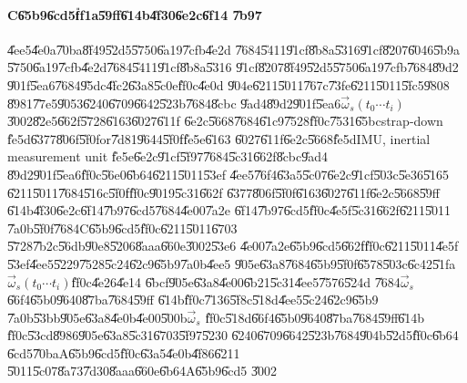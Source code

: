 \documentclass[12pt,a4paper]{article}
\begin{document}
\bigskip

\paragraph{C\U{65b9}\U{6cd5}\U{ff1a}\U{59ff}\U{614b}\U{4f30}\U{6e2c}\U{6f14}%
\U{7b97}}

\U{4ee5}\U{4e0a}\U{70ba}\U{8f49}\U{52d5}\U{5750}\U{6a19}\U{7cfb}\U{4e2d}%
\U{7684}\U{5411}\U{91cf}\U{8b8a}\U{5316}\U{91cf}\U{8207}\U{6046}\U{5b9a}%
\U{5750}\U{6a19}\U{7cfb}\U{4e2d}\U{7684}\U{5411}\U{91cf}\U{8b8a}\U{5316}%
\U{91cf}\U{8207}\U{8f49}\U{52d5}\U{5750}\U{6a19}\U{7cfb}\U{7684}\U{89d2}%
\U{901f}\U{5ea6}\U{7684}\U{95dc}\U{4fc2}\U{63a8}\U{5c0e}\U{ff0c}\U{4e0d}%
\U{904e}\U{6211}\U{5011}\U{767c}\U{73fe}\U{6211}\U{5011}\U{5fc5}\U{9808}%
\U{8981}\U{77e5}\U{9053}\U{6240}\U{6709}\U{6642}\U{523b}\U{7684}\U{8cbc}%
\U{9ad4}\U{89d2}\U{901f}\U{5ea6}$\vec{\omega}_{s}\left( t_{0}\cdots
t_{i}\right) $\U{3002}\U{82e5}\U{662f}\U{5728}\U{6163}\U{6027}\U{611f}%
\U{6e2c}\U{5668}\U{7684}\U{61c9}\U{7528}\U{ff0c}\U{7531}\U{65bc}strap-down%
\U{fe5d}\U{6377}\U{806f}\U{5f0f}or\U{7d81}\U{9644}\U{5f0f}\U{fe5e}\U{6163}%
\U{6027}\U{611f}\U{6e2c}\U{5668}\U{fe5d}IMU, inertial measurement unit%
\U{fe5e}\U{6e2c}\U{91cf}\U{5f97}\U{7684}\U{5c31}\U{662f}\U{8cbc}\U{9ad4}%
\U{89d2}\U{901f}\U{5ea6}\U{ff0c}\U{56e0}\U{6b64}\U{6211}\U{5011}\U{53ef}%
\U{4ee5}\U{76f4}\U{63a5}\U{5c07}\U{6e2c}\U{91cf}\U{503c}\U{5e36}\U{5165}%
\U{6211}\U{5011}\U{7684}\U{516c}\U{5f0f}\U{ff0c}\U{9019}\U{5c31}\U{662f}%
\U{6377}\U{806f}\U{5f0f}\U{6163}\U{6027}\U{611f}\U{6e2c}\U{5668}\U{59ff}%
\U{614b}\U{4f30}\U{6e2c}\U{6f14}\U{7b97}\U{6cd5}\U{7684}\U{4e00}\U{7a2e}%
\U{6f14}\U{7b97}\U{6cd5}\U{ff0c}\U{4e5f}\U{5c31}\U{662f}\U{6211}\U{5011}%
\U{7a0b}\U{5f0f}\U{7684}C\U{65b9}\U{6cd5}\U{ff0c}\U{6211}\U{5011}\U{6703}%
\U{5728}\U{7b2c}\U{56db}\U{90e8}\U{5206}\U{8aaa}\U{660e}\U{3002}\U{53e6}%
\U{4e00}\U{7a2e}\U{65b9}\U{6cd5}\U{662f}\U{ff0c}\U{6211}\U{5011}\U{4e5f}%
\U{53ef}\U{4ee5}\U{5229}\U{7528}\U{5c24}\U{62c9}\U{65b9}\U{7a0b}\U{4ee5}%
\U{905e}\U{63a8}\U{7684}\U{65b9}\U{5f0f}\U{6578}\U{503c}\U{6c42}\U{51fa}$%
\vec{\omega}_{s}\left( t_{0}\cdots t_{i}\right) $\U{ff0c}\U{4e26}\U{4e14}%
\U{6bcf}\U{905e}\U{63a8}\U{4e00}\U{6b21}\U{5c31}\U{4ee5}\U{7576}\U{524d}%
\U{7684}$\vec{\omega}_{s}$\U{66f4}\U{65b0}\U{9640}\U{87ba}\U{7684}\U{59ff}%
\U{614b}\U{ff0c}\U{7136}\U{5f8c}\U{518d}\U{4ee5}\U{5c24}\U{62c9}\U{65b9}%
\U{7a0b}\U{53bb}\U{905e}\U{63a8}\U{4e0b}\U{4e00}\U{500b}$\vec{\omega}_{s}$%
\U{ff0c}\U{518d}\U{66f4}\U{65b0}\U{9640}\U{87ba}\U{7684}\U{59ff}\U{614b}%
\U{ff0c}\U{53cd}\U{8986}\U{905e}\U{63a8}\U{5c31}\U{6703}\U{5f97}\U{5230}%
\U{6240}\U{6709}\U{6642}\U{523b}\U{7684}\U{904b}\U{52d5}\U{ff0c}\U{6b64}%
\U{6cd5}\U{70ba}A\U{65b9}\U{6cd5}\U{ff0c}\U{63a5}\U{4e0b}\U{4f86}\U{6211}%
\U{5011}\U{5c07}\U{8a73}\U{7d30}\U{8aaa}\U{660e}\U{6b64}A\U{65b9}\U{6cd5}%
\U{3002}
\end{document}

